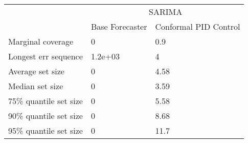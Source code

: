 \begin{tabular}{lll}
\toprule
& \multicolumn{2}{c}{SARIMA} \\
& Base Forecaster & Conformal PID Control \\
\midrule
Marginal coverage & 0 & 0.9 \\
Longest err sequence & 1.2e+03 & 4 \\
Average set size & 0 & 4.58 \\
Median set size & 0 & 3.59 \\
75\% quantile set size & 0 & 5.58 \\
90\% quantile set size & 0 & 8.68 \\
95\% quantile set size & 0 & 11.7 \\
\bottomrule
\end{tabular}
